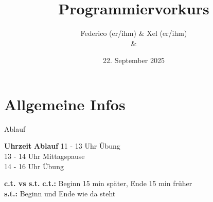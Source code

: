 \documentclass[t,aspectratio=1610, 12pt]{beamer} %
\date{22. September 2025}
\title{Programmiervorkurs}
\author{%
	Federico (er/ihm) \& Xel (er/ihm) \\
     {\scriptsize\mail{federico.alesiani@mathphys.info} \& \mail{xel@mathphys.info} }
    }
\begin{document}
\begin{frame}
    \maketitle{}
\end{frame}

\begin{frame}
    \tableofcontents{}
\end{frame}

\section{Allgemeine Infos}

\begin{frame}{Ablauf}
	\centering
	\begin{minipage}{0.4\textwidth}
		\begin{block}{\textbf{Uhrzeit} \qquad \textbf{Ablauf}}
				11 - 13 Uhr \qquad Übung \\
				13 - 14 Uhr \qquad Mittagspause \\
				14 - 16 Uhr \qquad Übung
		\end{block}
		\begin{tabbing}
		\end{tabbing}
	\end{minipage}
	\begin{block}{\centering \textbf{c.t. vs s.t.}}
		\centering \textbf{c.t.:} Beginn 15 min 	später, Ende 15 min früher \\
		\textbf{s.t.:} Beginn und Ende wie da steht 
	\end{block}
\end{frame}
\end{document}
